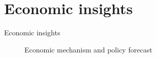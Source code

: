 \section{Economic insights}
\begin{frame}{Economic insights}
  \begin{figure}[h!]\centering
  \caption{Economic mechanism and policy forecast}\label{Economic mechanism and policy forecast}
  \hspace{0.5cm}
  \end{figure}
\end{frame}
